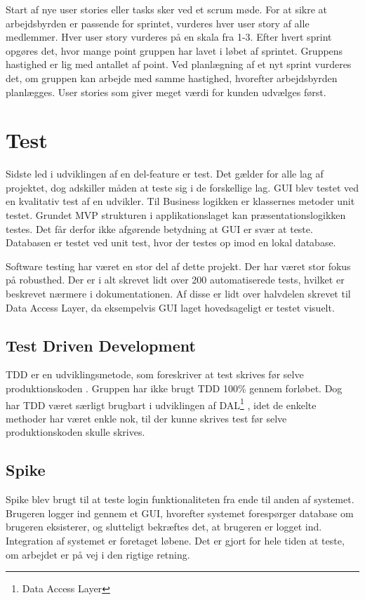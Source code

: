 
Start af nye user stories eller tasks sker ved et scrum møde. For at sikre at arbejdsbyrden er passende for sprintet, vurderes hver user story af alle medlemmer. Hver user story vurderes på en skala fra 1-3. Efter hvert sprint opgøres det, hvor mange point gruppen har lavet i løbet af sprintet. Gruppens hastighed er lig med antallet af point. Ved planlægning af et nyt sprint vurderes det, om gruppen kan arbejde med samme hastighed, hvorefter arbejdsbyrden planlægges. User stories som giver meget værdi for kunden udvælges først.  

\section{Test}
Sidste led i udviklingen af en del-feature er test. Det gælder for alle lag af projektet, dog adskiller måden at teste sig i de forskellige lag. GUI blev testet ved en kvalitativ test af en udvikler. Til Business logikken er klassernes metoder unit testet. Grundet MVP strukturen i applikationslaget kan præsentationslogikken testes. Det får derfor ikke afgørende betydning at GUI er svær at teste. Databasen er testet ved unit test, hvor der testes op imod en lokal database.  

Software testing har været en stor del af dette projekt. Der har været stor fokus på robusthed. Der er i alt skrevet lidt over 200 automatiserede tests, hvilket er beskrevet nærmere i dokumentationen. Af disse er lidt over halvdelen skrevet til Data Access Layer, da eksempelvis GUI laget hovedsageligt er testet visuelt.

\subsection{Test Driven Development}
TDD er en udviklingsmetode, som foreskriver at test skrives før selve produktionskoden \cite{osherove2015art}. Gruppen har ikke brugt TDD 100\% gennem forløbet. 
Dog har TDD været særligt brugbart i udviklingen af DAL\footnote{Data Access Layer} , idet de enkelte methoder har været enkle nok, til der kunne skrives test før selve produktionskoden skulle skrives.

\subsection{Spike} 
Spike blev brugt til at teste login funktionaliteten fra ende til anden af systemet. Brugeren logger ind gennem et GUI, hvorefter systemet forespørger database om brugeren eksisterer, og slutteligt bekræftes det, at brugeren er logget ind. Integration af systemet er foretaget løbene. Det er gjort for hele tiden at teste, om arbejdet er på vej i den rigtige retning. 

